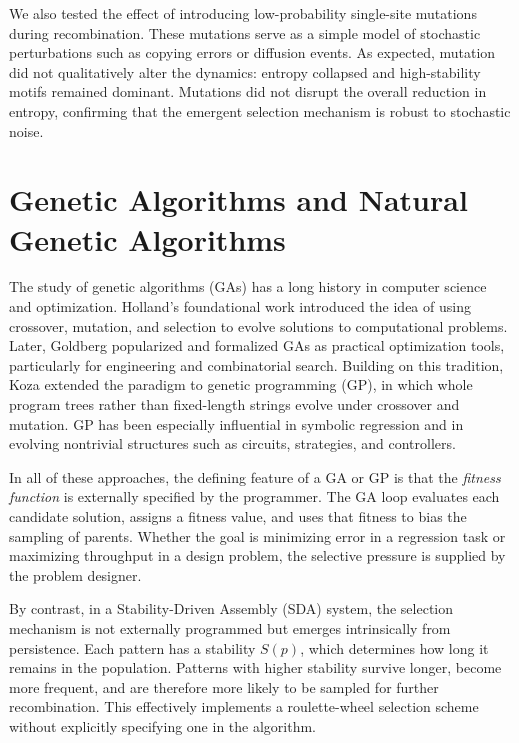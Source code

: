 \documentclass[life,article,submit,pdftex,moreauthors]{Definitions/mdpi}
\begin{document}
We also tested the effect of introducing low-probability single-site mutations during recombination. 
These mutations serve as a simple model of stochastic perturbations such as copying errors or
diffusion events. As expected, mutation did not qualitatively alter the dynamics: entropy
collapsed and high-stability motifs remained dominant. Mutations did not disrupt the overall reduction in entropy, confirming that the emergent selection mechanism is robust to stochastic noise.

\section{Genetic Algorithms and Natural Genetic Algorithms}

The study of genetic algorithms (GAs) has a long history in computer science and optimization. 
Holland’s foundational work \cite{holland1975adaptation} introduced the idea of using crossover, 
mutation, and selection to evolve solutions to computational problems. Later, Goldberg 
\cite{goldberg1989genetic} popularized and formalized GAs as practical optimization tools, 
particularly for engineering and combinatorial search. Building on this tradition, Koza 
\cite{koza1992genetic} extended the paradigm to genetic programming (GP), in which whole 
program trees rather than fixed-length strings evolve under crossover and mutation. GP has 
been especially influential in symbolic regression and in evolving nontrivial structures such 
as circuits, strategies, and controllers.

In all of these approaches, the defining feature of a GA or GP is that the \emph{fitness function} 
is externally specified by the programmer. The GA loop evaluates each candidate solution, assigns 
a fitness value, and uses that fitness to bias the sampling of parents. Whether the goal is 
minimizing error in a regression task or maximizing throughput in a design problem, the selective 
pressure is supplied by the problem designer.


By contrast, in a Stability-Driven Assembly (SDA) system, the selection mechanism is not externally
programmed but emerges intrinsically from persistence. Each pattern has a stability $S(p)$, 
which determines how long it remains in the population. Patterns with higher stability survive
longer, become more frequent, and are therefore more likely to be sampled for further
recombination. This effectively implements a roulette-wheel selection scheme without explicitly specifying one in the algorithm.
\end{document}
